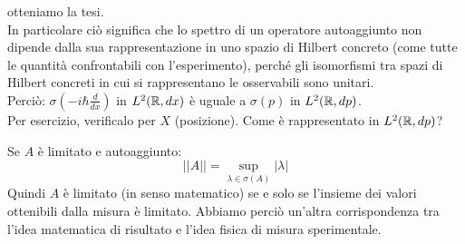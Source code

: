 \documentclass[../../FisicaTeorica.tex]{subfiles}
\begin{document}
\begin{enumerate}
	\begin{comment}
	\begin{align*} %
	\inf_{\psi\in D\left(U^{\dag A}\ U\right)}{\left(\Delta\left(U^\dag\ A\ U\right)\right)_{a,\psi}^2&=\inf_{\psi\in D\left(U^\dag A\ U\right)}{\left|\left|\left(U^\dag A\ U-a\right)\psi\right|\right|^2}}=\inf_{\psi\in D\left(U^\dag A\ U\right)}{\left|\left|U^\dag\left(A-a\right)U\psi\right|\right|^2}\\
	&=\inf_{\psi\in D\left(U^\dag A U\right)}{\left|\left|\left(A-a\right)U\psi\right|\right|=\inf_{\phi\in D\left(A\right)}{\left|\left|\left(A-a\right)\phi\right|\right|^2}=\inf_{\phi\in D\left(A\right)}{\left(\Delta A\right)_{a,\phi}^2\ }}
	\end{align*}
	\end{comment}
	otteniamo la tesi.\\
	In particolare ciò significa che lo spettro di un operatore autoaggiunto non dipende dalla sua rappresentazione in uno spazio di Hilbert concreto (come tutte le quantità confrontabili con l'esperimento), perché gli isomorfismi tra spazi di Hilbert concreti in cui si rappresentano le osservabili sono unitari.\\
	Perciò: 
	$\sigma \left(-i\hbar\frac{d}{dx}\right)$ in $L^2(\mathbb{R}, dx)$ è uguale a $\sigma \left(p\right)$ in $L^2(\mathbb{R},dp)$.\\
	Per esercizio, verificalo per $X$ (posizione). Come è rappresentato in $L^2(\mathbb{R}, dp)$?
	\begin{oss}
	Se $A$ è limitato e autoaggiunto:
	\[
	\left|\left|A\right|\right|=\sup_{\lambda\in\sigma\left(A\right)}{\left|\lambda\right|}
	\]
	Quindi $A$ è limitato (in senso matematico) se e solo se l'insieme dei valori ottenibili dalla misura è limitato. Abbiamo perciò un'altra corrispondenza tra l'idea matematica di risultato e l'idea fisica di misura sperimentale.
	\end{oss}

\end{enumerate}
\end{document}
